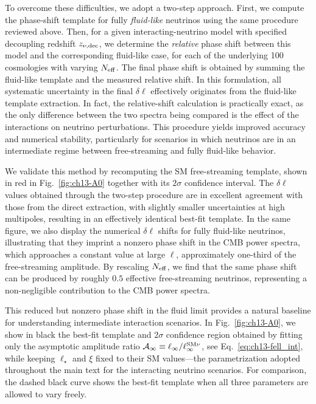\begin{subappendices}
To overcome these difficulties, we adopt a two-step approach. First, we compute the phase-shift template for fully {\it fluid-like} neutrinos using the same procedure reviewed above. Then, for a given interacting-neutrino model with specified decoupling redshift $z_{\nu,\rm dec}$, we determine the {\it relative} phase shift between this model and the corresponding fluid-like case, for each of the underlying 100 cosmologies with varying $N_{\rm eff}$. The final phase shift is obtained by summing the fluid-like template and the measured relative shift. In this formulation, all systematic uncertainty in the final $\delta\ell$ effectively originates from the fluid-like template extraction. In fact, the relative-shift calculation is practically exact, as the only difference between the two spectra being compared is the effect of the interactions on neutrino perturbations. This procedure yields improved accuracy and numerical stability, particularly for scenarios in which neutrinos are in an intermediate regime between free-streaming and fully fluid-like behavior.

We validate this method by recomputing the SM free-streaming template, shown in red in Fig.~\ref{fig:ch13-A0} together with its $2\sigma$ confidence interval. The $\delta\ell$ values obtained through the two-step procedure are in excellent agreement with those from the direct extraction, with slightly smaller uncertainties at high multipoles, resulting in an effectively identical best-fit template.  In the same figure, we also display the numerical $\delta\ell$ shifts for fully fluid-like neutrinos, illustrating that they imprint a nonzero phase shift in the CMB power spectra, which approaches a constant value at large $\ell$, approximately one-third of the free-streaming amplitude. By rescaling $N_\mathrm{eff}$, we find that the same phase shift can be produced by roughly $0.5$ effective free-streaming neutrinos, representing a non-negligible contribution to the CMB power spectra.

This reduced but nonzero phase shift in the fluid limit provides a natural baseline for understanding intermediate interaction scenarios. In Fig.~\ref{fig:ch13-A0}, we show in black the best-fit template and $2\sigma$ confidence region obtained by fitting only the asymptotic amplitude ratio $\mathcal{A}_\infty\equiv \ell_\infty/\ell_{\infty}^{\rm SM\nu}$, see Eq.~\eqref{eq:ch13-fell_int}, while keeping $\ell_\star$ and $\xi$ fixed to their SM values---the parametrization adopted throughout the main text for the interacting neutrino scenarios. For comparison, the dashed black curve shows the best-fit template when all three parameters are allowed to vary freely.


\end{subappendices}
